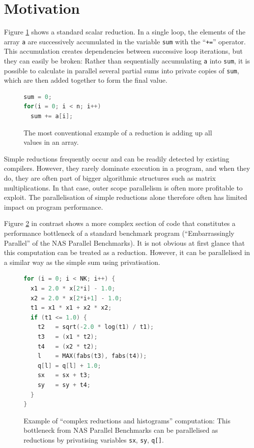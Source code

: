 \section{Motivation}

    Figure \ref{sum-figure} shows a standard scalar reduction.
    In a single loop, the elements of the array \texttt{a} are successively
    accumulated in the variable \texttt{sum} with the ``\texttt{+=}'' operator.
    This accumulation creates dependencies between successive loop iterations,
    but they can easily be broken:
    Rather than sequentially accumulating {\tt a} into {\tt sum}, it is possible
    to calculate in parallel several partial sums into private copies of
    \texttt{sum}, which are then added together to form the final value.

\begin{figure}[h]
\begin{lstlisting}[language=C++]
sum = 0;
for(i = 0; i < n; i++)
  sum += a[i];
\end{lstlisting}
\caption{The most conventional example of a reduction is adding up all values in
         an array.}
\label{sum-figure}
\end{figure}

    Simple reductions frequently occur and can be readily detected by existing
    compilers.
    However, they rarely dominate execution in a program, and when they do, they
    are often part of bigger algorithmic structures such as matrix
    multiplications.
    In that case, outer scope parallelism is often more profitable to exploit.
    The parallelisation of simple reductions alone therefore often has limited
    impact on program performance.

    Figure \ref{complex-reduction-figure} in contrast shows a more complex
    section of code that constitutes a performance bottleneck of a standard
    benchmark program
    (``Embarrassingly Parallel'' of the NAS Parallel Benchmarks).
    It is not obvious at first glance that this computation can be treated as a
    reduction.
    However, it can be parallelised in a similar way as the simple sum using
    privatisation.

\begin{figure}[h]
\begin{lstlisting}[language=C++]
for (i = 0; i < NK; i++) {
  x1 = 2.0 * x[2*i] - 1.0;
  x2 = 2.0 * x[2*i+1] - 1.0;
  t1 = x1 * x1 + x2 * x2;
  if (t1 <= 1.0) {
    t2   = sqrt(-2.0 * log(t1) / t1);
    t3   = (x1 * t2);
    t4   = (x2 * t2);
    l    = MAX(fabs(t3), fabs(t4));
    q[l] = q[l] + 1.0;
    sx   = sx + t3;
    sy   = sy + t4;
  }
}
\end{lstlisting}
\caption{Example of ``complex reductions and histograms'' computation:
         This bottleneck from NAS Parallel Benchmarks can be parallelised
         as reductions by privatising variables \texttt{sx}, \texttt{sy},
         \texttt{q[]}.}
\label{complex-reduction-figure}
\end{figure}

